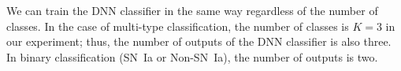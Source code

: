\documentclass[proof]{pasj01}
\begin{document}
We can train the DNN classifier in the same way regardless of the number of classes.
In the case of multi-type classification, the number of classes is $K = 3$ in our experiment; thus, the number of outputs of the DNN classifier is also three.
In binary classification (SN~Ia or Non-SN~Ia), the number of outputs is two.
\end{document}

